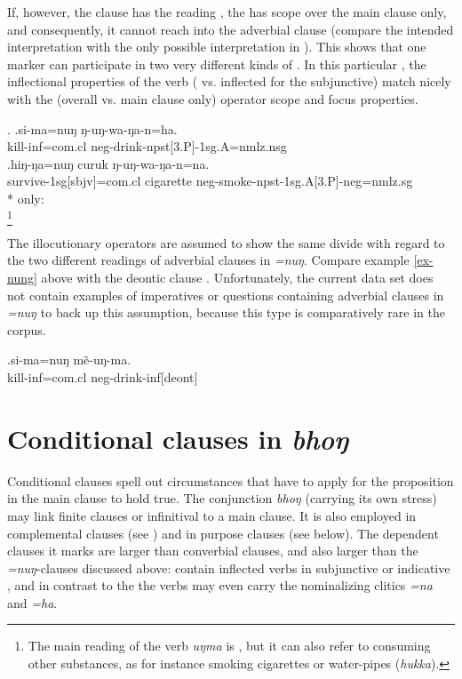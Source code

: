 If, however, the clause has the reading , the  has scope over the main clause only, and consequently, it cannot reach into the adverbial clause (compare the intended interpretation with the only possible interpretation in \Next[b]). This shows that one marker can participate in two very different kinds of . In this particular , the inflectional properties of the verb ( vs. inflected for the subjunctive) match nicely with the (overall vs. main clause only) operator scope and focus properties.

	\ex. \ag.si-ma=nuŋ ŋ-uŋ-wa-ŋa-n=ha.\\
	kill{\sc -inf=com.cl} {\sc neg-}drink{-npst[3.P]-1sg.A=nmlz.nsg}\\
	\bg.hiŋ-ŋa=nuŋ curuk ŋ-uŋ-wa-ŋa-n=na.\\
survive{\sc -1sg[sbjv]=com.cl} cigarette   {\sc neg-}smoke{\sc -npst-1sg.A[3.P]-neg=nmlz.sg}\\
* only:\\
\footnote{The main reading of the verb \emph{uŋma} is  , but it can also refer to consuming other substances, as for instance smoking cigarettes or water-pipes (\emph{hukka}).}

The illocutionary operators are assumed to show the same divide with regard to the two different readings of adverbial clauses in \emph{=nuŋ}. Compare example \ref{ex-nung} above with the deontic clause \Next. Unfortunately, the current data set does not contain examples of imperatives or questions containing adverbial clauses in \emph{=nuŋ} to back up this assumption, because this  type is comparatively rare in the corpus.

	\exg.si-ma=nuŋ mẽ-uŋ-ma.\\
	kill{\sc -inf=com.cl} {\sc neg-}drink{\sc -inf[deont]}\\


\section{Conditional clauses in \emph{bhoŋ}}\label{adv-cl-cond}


Conditional clauses spell out circumstances that have to apply for the proposition in the main clause to hold true.  The conjunction \emph{bhoŋ} (carrying its own stress) may link finite clauses or infinitival   to a main clause. It is also employed in complemental clauses (see ) and in purpose clauses (see  below). The dependent clauses it marks are larger than converbial clauses, and also larger than the \emph{=nuŋ}-clauses discussed above:  contain inflected verbs in subjunctive or indicative , and in contrast to the  the verbs may even carry the nominalizing  clitics \emph{=na} and \emph{=ha}. 

